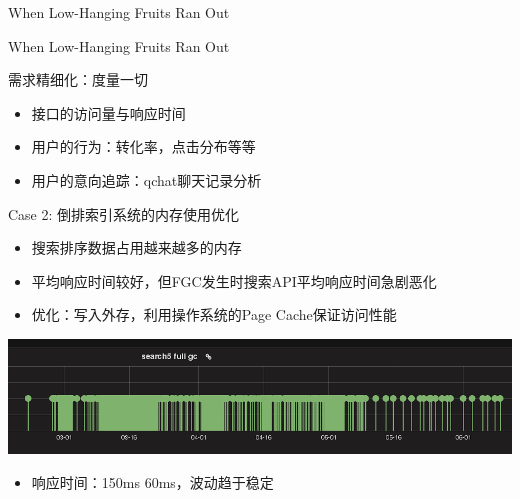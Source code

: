 \documentclass[handout]{beamer}
\begin{document}
\begin{CJK}{UTF8}{gbsn}
\begin{frame}{When Low-Hanging Fruits Ran Out}
  \begin{center}
    \plotNumProductGrowthChart[scale=0.7]
  \end{center}
\end{frame}

\begin{frame}{When Low-Hanging Fruits Ran Out}
  \begin{center}
    \plotGMVGrowthChart[scale=0.7]
  \end{center}
\end{frame}

\begin{frame}{需求精细化：度量一切}
  \begin{itemize}
  \item { 接口的访问量与响应时间 }
  \item { 用户的行为：转化率，点击分布等等 }
  \item { 用户的意向追踪：qchat聊天记录分析 }
  \end{itemize}
\end{frame}

\begin{frame}{Case 2: 倒排索引系统的内存使用优化}
  \begin{itemize}
    \item {搜索排序数据占用越来越多的内存}
    \item {平均响应时间较好，但FGC发生时搜索API平均响应时间急剧恶化}
    \item {优化：写入外存，利用操作系统的Page Cache保证访问性能}
  \end{itemize}
  \begin{center}
    \includegraphics[scale=0.3]{./images/searchengine-fullgc}
  \end{center}
  \begin{itemize}
  \item {响应时间：150ms  60ms，波动趋于稳定}
  \end{itemize}
\end{frame}


\end{CJK}
\end{document}
